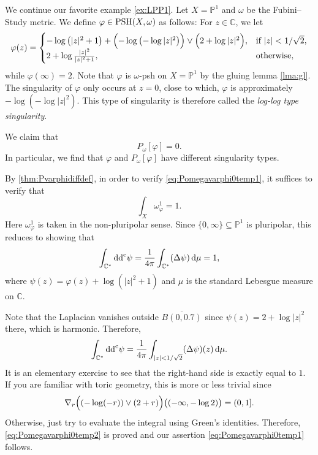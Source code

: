 \begin{example}\label{ex:loglogsing}
    We continue our favorite example \cref{ex:LPP1}. Let $X=\mathbb{P}^1$ and $\omega$ be the Fubini--Study metric. We define $\varphi\in \mathrm{PSH}(X,\omega)$ as follows: For $z\in \mathbb{C}$, we let
    \[
    \varphi(z)=
    \begin{cases}
        -\log \left(|z|^2+1\right)+\Bigl(-\log \left(-\log |z|^2\right)\Bigr) \lor \Bigl(2+\log |z|^2\Bigr),& \textup{if }|z|<1/\sqrt{2},\\
        2+\log \frac{|z|^2}{|z|^2+1},& \textup{otherwise},
    \end{cases}
    \]
    while $\varphi(\infty)=2$. Note that $\varphi$ is $\omega$-psh on $X=\mathbb{P}^1$ by the gluing lemma \cref{lma:gl}.
The singularity of $\varphi$ only occurs at $z=0$, close to which, $\varphi$ is approximately $-\log \left(-\log |z|^2\right)$. This type of singularity is therefore called the \emph{log-log type singularity}.

    We claim that
    \begin{equation}\label{eq:Pomegavarphi0temp1}
        P_{\omega}[\varphi]=0.
    \end{equation}
    In particular, we find that $\varphi$ and $P_{\omega}[\varphi]$ have different singularity types.

    By \cref{thm:Pvarphidiffdef}, in order to verify \eqref{eq:Pomegavarphi0temp1}, it suffices to verify that
    \begin{equation}\label{eq:Pomegavarphi0temp2}
    \int_X \omega_{\varphi}^1=1.
    \end{equation}
    Here $\omega_{\varphi}^1$ is taken in the non-pluripolar sense. Since $\{0,\infty\}\subseteq \mathbb{P}^1$ is pluripolar, this reduces to showing that
    \[
    \int_{\mathbb{C}^*} \mathrm{dd}^{\mathrm{c}} \psi=\frac{1}{4\pi}\int_{\mathbb{C}^*} (\Delta \psi)\,\mathrm{d}\mu=1,
    \]
    where $\psi(z)=\varphi(z)+\log (|z|^2+1)$ and $\mu$ is the standard Lebesgue measure on $\mathbb{C}$.

    Note that the Laplacian vanishes outside $\overline{B(0,0.7)}$ since $\psi(z)=2+\log |z|^2$ there, which is harmonic. Therefore,
    \[
    \int_{\mathbb{C}^*} \mathrm{dd}^{\mathrm{c}} \psi=\frac{1}{4\pi}\int_{|z|<1/\sqrt{2}} (\Delta \psi)(z)\,\mathrm{d}\mu.
    \]
    It is an elementary exercise to see that the right-hand side is exactly equal to $1$. If you are familiar with toric geometry, this is more or less trivial since
    \[
    \nabla_r \Bigl( \left(-\log (-r)\right)\lor (2+r) \Bigr)\bigl((-\infty,-\log 2)\bigr)= (0,1].
    \]
    Otherwise, just try to evaluate the integral using Green's identities. Therefore, \eqref{eq:Pomegavarphi0temp2} is proved and our assertion \eqref{eq:Pomegavarphi0temp1} follows.
\end{example}


